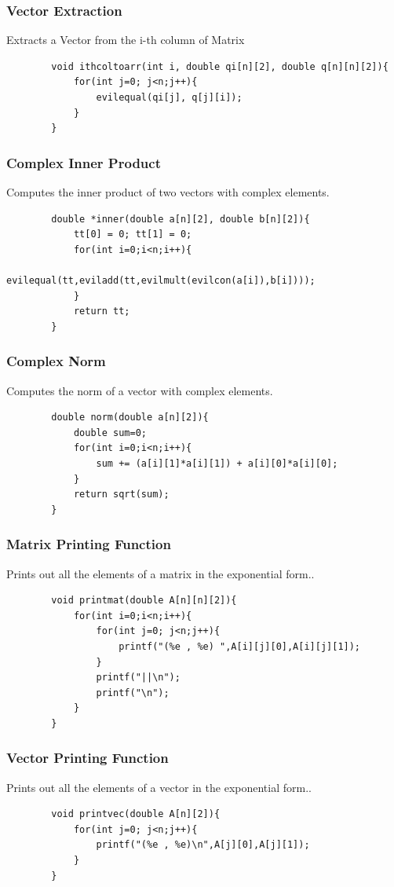 \documentclass[12pt]{article}
\begin{document}
		\subsubsection{Vector Extraction}
	Extracts a Vector from the i-th column of Matrix
	\begin{lstlisting}
		void ithcoltoarr(int i, double qi[n][2], double q[n][n][2]){
			for(int j=0; j<n;j++){
				evilequal(qi[j], q[j][i]);
			}
		}
	\end{lstlisting}
	\subsubsection{Complex Inner Product}
	Computes the inner product of two vectors with complex elements.
	\begin{lstlisting}
		double *inner(double a[n][2], double b[n][2]){
			tt[0] = 0; tt[1] = 0;
			for(int i=0;i<n;i++){
				evilequal(tt,eviladd(tt,evilmult(evilcon(a[i]),b[i])));
			}
			return tt;
		}
	\end{lstlisting}
	\subsubsection{Complex Norm}
	Computes the norm of a vector with complex elements.
	\begin{lstlisting}
		double norm(double a[n][2]){
			double sum=0;
			for(int i=0;i<n;i++){
				sum += (a[i][1]*a[i][1]) + a[i][0]*a[i][0];
			}
			return sqrt(sum);
		}
	\end{lstlisting}
	\subsubsection{Matrix Printing Function}
	Prints out all the elements of a matrix in the exponential form..
	\begin{lstlisting}
		void printmat(double A[n][n][2]){
			for(int i=0;i<n;i++){
				for(int j=0; j<n;j++){
					printf("(%e , %e) ",A[i][j][0],A[i][j][1]);
				}
				printf("||\n");
				printf("\n");
			}
		}
	\end{lstlisting}
	\subsubsection{Vector Printing Function}
	Prints out all the elements of a vector in the exponential form..
	\begin{lstlisting}
		void printvec(double A[n][2]){
			for(int j=0; j<n;j++){
				printf("(%e , %e)\n",A[j][0],A[j][1]);
			}
		}
	\end{lstlisting}
\end{document}

